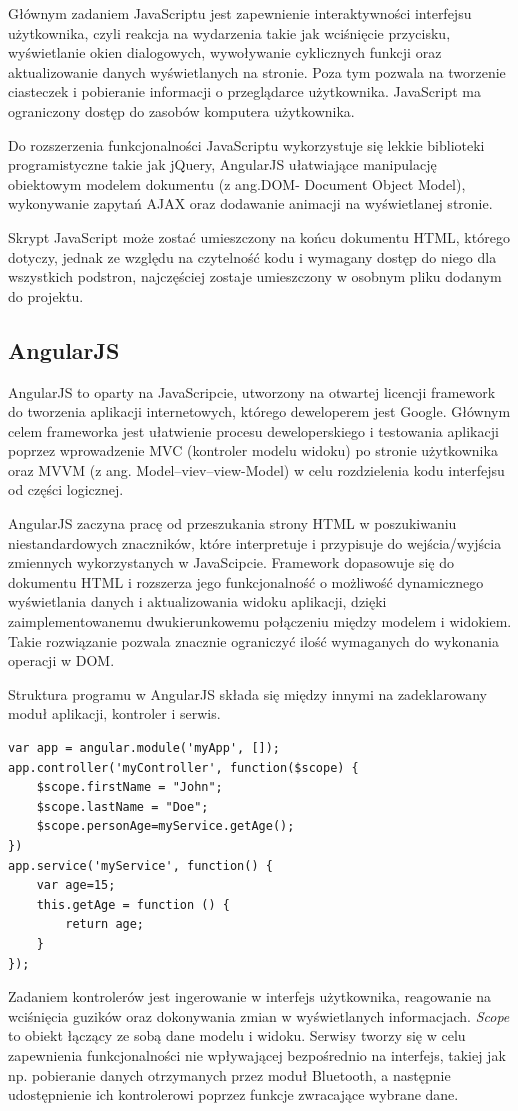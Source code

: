 Głównym zadaniem JavaScriptu jest zapewnienie interaktywności interfejsu użytkownika, czyli reakcja na wydarzenia takie jak wciśnięcie przycisku, wyświetlanie okien dialogowych, wywoływanie cyklicznych funkcji oraz aktualizowanie danych wyświetlanych na stronie. Poza tym pozwala na tworzenie ciasteczek i pobieranie informacji o przeglądarce użytkownika. JavaScript ma ograniczony dostęp do zasobów komputera użytkownika.

Do rozszerzenia funkcjonalności JavaScriptu wykorzystuje się lekkie biblioteki programistyczne takie jak jQuery, AngularJS ułatwiające manipulację obiektowym modelem dokumentu (z ang.DOM- Document Object Model), wykonywanie zapytań AJAX oraz dodawanie animacji na wyświetlanej stronie.

Skrypt JavaScript może zostać umieszczony na końcu dokumentu HTML, którego dotyczy, jednak ze względu na czytelność kodu i wymagany dostęp do niego dla wszystkich podstron, najczęściej zostaje umieszczony w osobnym pliku dodanym do projektu.

\subsection{AngularJS}%
AngularJS to oparty na JavaScripcie, utworzony na otwartej licencji framework do tworzenia aplikacji internetowych, którego deweloperem jest Google. Głównym celem frameworka jest ułatwienie procesu deweloperskiego i testowania aplikacji poprzez wprowadzenie MVC (kontroler modelu widoku) po stronie użytkownika oraz MVVM (z ang. Model--viev--view-Model) w celu rozdzielenia kodu interfejsu od części logicznej.

AngularJS zaczyna pracę od przeszukania strony HTML w poszukiwaniu niestandardowych znaczników, które interpretuje i przypisuje do wejścia/wyjścia zmiennych wykorzystanych w JavaScipcie. Framework dopasowuje się do dokumentu HTML i rozszerza jego funkcjonalność o możliwość dynamicznego wyświetlania danych i aktualizowania widoku aplikacji, dzięki zaimplementowanemu dwukierunkowemu połączeniu między modelem i widokiem. Takie rozwiązanie pozwala znacznie ograniczyć ilość wymaganych do wykonania operacji w DOM.

Struktura programu w AngularJS składa się między innymi na zadeklarowany moduł aplikacji, kontroler i serwis.
\lstset{language=Java}
\begin{lstlisting} 
var app = angular.module('myApp', []);
app.controller('myController', function($scope) {
    $scope.firstName = "John";
    $scope.lastName = "Doe";
    $scope.personAge=myService.getAge();
})
app.service('myService', function() {
	var age=15;
    this.getAge = function () {
        return age;
    }
});
\end{lstlisting}
Zadaniem kontrolerów jest ingerowanie w interfejs użytkownika, reagowanie na wciśnięcia guzików oraz dokonywania zmian w wyświetlanych informacjach. \textit{Scope} to obiekt łączący ze sobą dane modelu i widoku. Serwisy tworzy się w celu zapewnienia funkcjonalności nie wpływającej bezpośrednio na interfejs, takiej jak np. pobieranie danych otrzymanych przez moduł Bluetooth, a następnie udostępnienie ich kontrolerowi poprzez funkcje zwracające wybrane dane.


